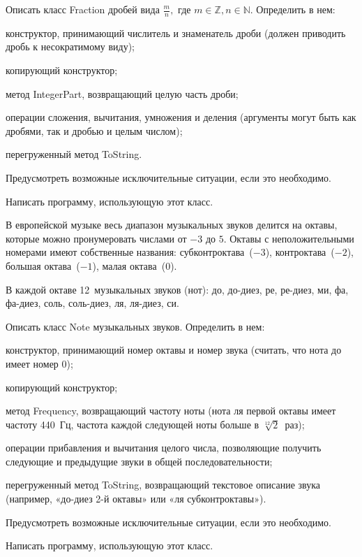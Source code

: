 \task Описать класс Fraction дробей вида $\frac{m}{n},$ где $m \in
\mathbb{Z}, n \in \mathbb{N}$.  Определить в нем:
\begin{itemize*}
\item конструктор, принимающий числитель и знаменатель дроби (должен
  приводить дробь к несократимому виду);
\item копирующий конструктор;
\item метод IntegerPart, возвращающий целую часть дроби;
\item операции сложения, вычитания, умножения и деления (аргументы
  могут быть как дробями, так и дробью и целым числом);
\item перегруженный метод ToString.
\end{itemize*}

Предусмотреть возможные исключительные ситуации, если это необходимо.

Написать программу, использующую этот класс.

\task В европейской музыке весь диапазон музыкальных звуков делится на
октавы, которые можно пронумеровать числами от $-3$ до $5$. Октавы с
неположительными номерами имеют собственные названия:
субконтроктава~($-3$), контроктава~($-2$), большая октава~($-1$),
малая октава~($0$).

В каждой октаве 12~музыкальных звуков (нот): до, до-диез, ре, ре-диез,
ми, фа, фа-диез, соль, соль-диез, ля, ля-диез, си.

Описать класс Note музыкальных звуков. Определить в нем:
\begin{itemize*}
\item конструктор, принимающий номер октавы и номер звука (считать,
  что нота до имеет номер $0$);
\item копирующий конструктор;
\item метод Frequency, возвращающий частоту ноты (нота ля первой
  октавы имеет частоту 440~Гц, частота каждой следующей ноты больше в
  $\sqrt[12]{2}$~раз);
\item операции прибавления и вычитания целого числа, позволяющие
  получить следующие и предыдущие звуки в общей последовательности;
\item перегруженный метод ToString, возвращающий текстовое описание
  звука (например, «до-диез 2-й октавы» или «ля субконтроктавы»).
\end{itemize*}

Предусмотреть возможные исключительные ситуации, если это необходимо.

Написать программу, использующую этот класс.

